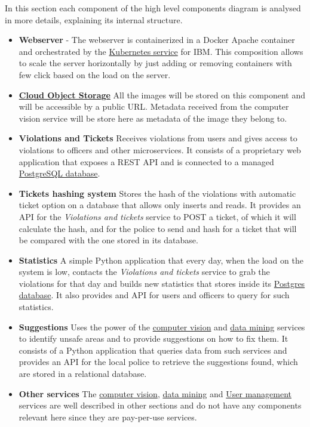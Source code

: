 In this section each component of the high level components diagram is analysed in more details, explaining
its internal structure.

\begin{itemize}
    \item \textbf{Webserver} - 
    The webserver is containerized in a Docker Apache container and orchestrated by the \hyperlink{kubernetes}{Kubernetes service} for IBM.
    This composition allows to scale the server horizontally by just adding or removing containers with few click based on the load on the server.

    \item \hyperlink{cloudObjectStorage}{\textbf{Cloud Object Storage}}
    All the images will be stored on this component and will be accessible by a public URL. Metadata received from the computer vision service will be store here as metadata of the image they belong to.

    \item \textbf{Violations and Tickets}
    Receives violations from users and gives access to violations to officers and other microservices. It consists of a proprietary web application that exposes a REST API and is connected to a managed \hyperlink{postgres}{PostgreSQL database}.

    \item \textbf{Tickets hashing system}
    Stores the hash of the violations with automatic ticket option on a database that allows only inserts and reads.
    It provides an API for the \textit{Violations and tickets} service to POST a ticket, of which it will calculate the hash,
    and for the police to send and hash for a ticket that will be compared with the one stored in its database.

    \item \textbf{Statistics}
    A simple Python application that every day, when the load on the system is low, contacts the \textit{Violations and tickets} service to grab the violations for that day and builds new statistics that stores inside its \hyperlink{postgres}{Postgres database}.
    It also provides and API for users and officers to query for such statistics.

    \item \textbf{Suggestions}
    Uses the power of the \hyperlink{watson}{computer vision} and \hyperlink{discovery}{data mining} services to identify unsafe areas and to provide
    suggestions on how to fix them. It consists of a Python application that queries data from such services and provides an API for the local police to retrieve the
    suggestions found, which are stored in a relational database.

    \item \textbf{Other services}
    The \hyperlink{watson}{computer vision}, \hyperlink{discovery}{data mining} and \hyperlink{appid}{User management} services are well described in other sections and do not have any components relevant here since they are pay-per-use services.
\end{itemize}